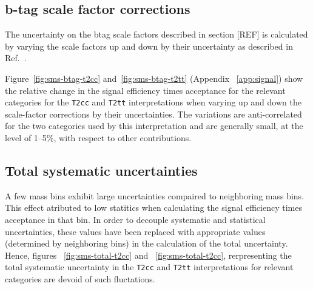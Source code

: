 \subsection{b-tag scale factor corrections\label{sec:sms-syst-btag}}

The uncertainty on the btag scale factors described in section [REF]
is calculated by varying the scale factors up and down by their
uncertainty as described in Ref.~\cite{btagpogtwiki}.

Figure~\ref{fig:sms-btag-t2cc} and~\ref{fig:sms-btag-t2tt} (Appendix ~\ref{app:signal})
show the relative change in the signal efficiency times acceptance for 
the relevant categories for the \verb!T2cc! and \verb!T2tt! interpretations
when varying up and down the scale-factor corrections by their uncertainties. 
The variations  are anti-correlated for the two \nb categories used by this
interpretation and are generally small, at the level of 1--5\%, with
respect to other contributions. 

\subsection{Total systematic uncertainties\label{sec:total-sms-unc}}

A few mass bins exhibit large uncertainties compaired to neighboring 
mass bins.  This effect atributed to low statitics when calculating the signal
efficiency times acceptance in that bin. In order to decouple systematic
and statistical uncertainties, these values have been replaced with appropriate 
values (determined by neighboring bins) in the calculation of the
total uncertainty. Hence, figures ~\ref{fig:sms-total-t2cc} and
~\ref{fig:sms-total-t2cc}, rerpresenting the total
systematic uncertainty in the \verb!T2cc! and \verb!T2tt! interpretations
for relevant categories are devoid of such fluctations.

